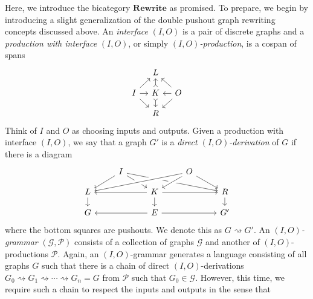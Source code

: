 \documentclass[11pt]{amsart}
\newcommand{\cat}[1]{\mathbf{#1}}
\theoremstyle{remark}
\theoremstyle{definition}
\begin{document}
Here, we introduce the bicategory $\cat{Rewrite}$ as promised.  To prepare, we begin by introducing a slight generalization of the double pushout graph rewriting concepts discussed above.  
An \emph{interface} $(I,O)$ is a pair of discrete graphs and a \emph{production with interface} $(I,O)$, or simply \emph{$(I,O)$-production}, is a cospan of spans
\[
\begin{tikzcd}[column sep=1em,row sep=1em]
	{} &
	{L} & 
	{} \\
	{I} \ar[ru] \ar[r] \ar[rd]&
	{K} \ar[u,rightarrowtail] \ar[d,rightarrowtail] & 
	{O} \ar[lu] \ar[l] \ar[ld] \\
	{} &
	{R} & 
	{} 
\end{tikzcd}
\]
Think of $I$ and $O$ as choosing inputs and outputs. Given a production with interface $(I,O)$, we say that a graph $G'$ is a \emph{direct $(I,O)$-derivation} of $G$ if there is a diagram
\[
\begin{tikzcd}[row sep=1em]
	{} &
	{I}
		\ar[dl]
		\ar[dr]
		\ar[drrr] &
	{} &
	{O} 
		\ar[dr]
		\ar[dl,crossing over]
		\ar[dlll,crossing over] &
	{} \\
	{L} 
		\ar[d]  &
		{} &
	{K} 
		\ar[ll] 
		\ar[d]
		\ar[rr] &
	{} &
	{R} 
		\ar[d] \\
	{G} &
	{} &
	{E} 
		\ar[rr]
		\ar[ll] &
	{} &
	{G'}
\end{tikzcd}
\]
where the bottom squares are pushouts. We denote this as $G \rightsquigarrow G'$. An \emph{$(I,O)$-grammar} $(\mathcal{G},\mathcal{P})$ consists of a collection of graphs $\mathcal{G}$ and another of $(I,O)$-productions $\mathcal{P}$. Again, an $(I,O)$-grammar generates a language consisting of all graphs $G$ such that there is a chain of direct $(I,O)$-derivations $G_0 \rightsquigarrow G_1 \rightsquigarrow \dotsm \rightsquigarrow G_n=G$ from $\mathcal{P}$ such that $G_0 \in \mathcal{G}$. However, this time, we require such a chain to respect the inputs and outputs in the sense that 
\end{document}
